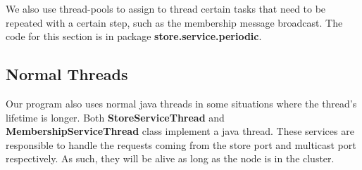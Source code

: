 We also use thread-pools to assign to thread certain tasks that need to be repeated with a certain step, such as the membership message broadcast. The code for this section is in package \textbf{store.service.periodic}.

\subsection{Normal Threads}

Our program also uses normal java threads in some situations where the thread's lifetime is longer. Both \textbf{StoreServiceThread} and \textbf{MembershipServiceThread} class implement a java thread. These services are responsible to handle the requests coming from the store port and multicast port respectively. As such, they will be alive as long as the node is in the cluster.